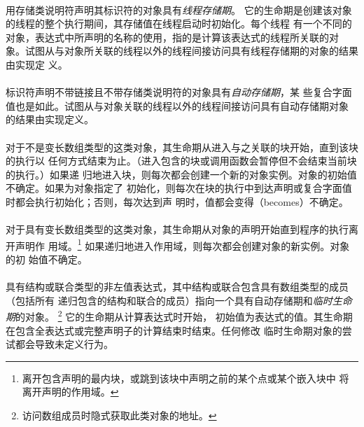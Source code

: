 {\paragraph{}
用存储类说明符声明其标识符的对象具有\textit{线程存储期}。
它的生命期是创建该对象的线程的整个执行期间，其存储值在线程启动时初始化。每个线程
有一个不同的对象，表达式中所声明的名称的使用，指的是计算该表达式的线程所关联的对
象。试图从与对象所关联的线程以外的线程间接访问具有线程存储期的对象的结果由实现定
义。

\paragraph{}
标识符声明不带链接且不带存储类说明符的对象具有\textit{自动存储期}，某
些复合字面值也是如此。试图从与对象关联的线程以外的线程间接访问具有自动存储期对象
的结果由实现定义。

\paragraph{}
对于不是变长数组类型的这类对象，其生命期从进入与之关联的块开始，直到该块的执行以
任何方式结束为止。（进入包含的块或调用函数会暂停但不会结束当前块的执行。）如果递
归地进入块，则每次都会创建一个新的对象实例。对象的初始值不确定。如果为对象指定了
初始化，则每次在块的执行中到达声明或复合字面值时都会执行初始化；否则，每次达到声
明时，值都会变得（becomes）不确定。

\paragraph{}
对于具有变长数组类型的这类对象，其生命期从对象的声明开始直到程序的执行离开声明作
用域。\footnote{离开包含声明的最内块，或跳到该块中声明之前的某个点或某个嵌入块中
将离开声明的作用域。} 如果递归地进入作用域，则每次都会创建对象的新实例。对象的初
始值不确定。

\paragraph{}
具有结构或联合类型的非左值表达式，其中结构或联合包含具有数组类型的成员（包括所有
递归包含的结构和联合的成员）指向一个具有自动存储期和\textit{临时生命期}的对象。
\footnote{访问数组成员时隐式获取此类对象的地址。} 它的生命期从计算表达式时开始，
初始值为表达式的值。其生命期在包含全表达式或完整声明子的计算结束时结束。任何修改
临时生命期对象的尝试都会导致未定义行为。


}
